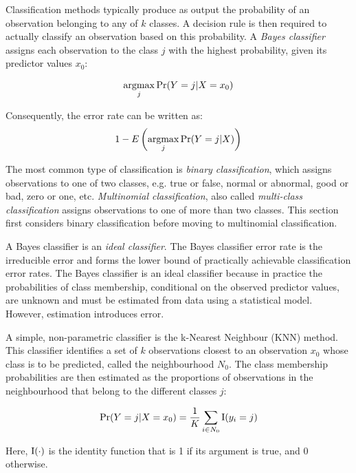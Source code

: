 Classification methods typically produce as output the probability of an observation belonging to any of $k$ classes. A decision rule is then required to actually classify an observation based on this probability. A \emph{Bayes classifier} assigns each observation to the class $j$ with the highest probability, given its predictor values $x_0$:

\begin{align*}
\operatorname*{argmax}_j \Pr(Y=j| X=x_0)
\end{align*}

\noindent Consequently, the error rate can be written as:
\begin{align*}
1 - E \left( \operatorname*{argmax}_j \Pr (Y=j | X) \right)
\end{align*}

The most common type of classification is \emph{binary classification}, which assigns observations to one of two classes, e.g. true or false, normal or abnormal, good or bad, zero or one, etc. \emph{Multinomial classification}, also called \emph{multi-class classification} assigns observations to one of more than two classes. This section first considers binary classification before moving to multinomial classification.

A Bayes classifier is an \emph{ideal classifier}. The Bayes classifier error rate is the irreducible error and forms the lower bound of practically achievable classification error rates. The Bayes classifier is an ideal classifier because in practice the probabilities of class membership, conditional on the observed predictor values, are unknown and must be estimated from data using a statistical model. However, estimation introduces error.

A simple, non-parametric classifier is the k-Nearest Neighbour (KNN) method. This classifier identifies a set of $k$ observations closest to an observation $x_0$ whose class is to be predicted, called the neighbourhood $N_0$. The class membership probabilities are then estimated as the proportions of observations in the neighbourhood that belong to the different classes $j$:

\begin{align*}
\Pr (Y=j|X=x_0) = \frac{1}{K} \sum_{i \in N_0} \operatorname{I} (y_i=j) 
\end{align*}

\noindent 
Here, $\operatorname{I}(\cdot)$ is the identity function that is 1 if its argument is true, and 0 otherwise.

